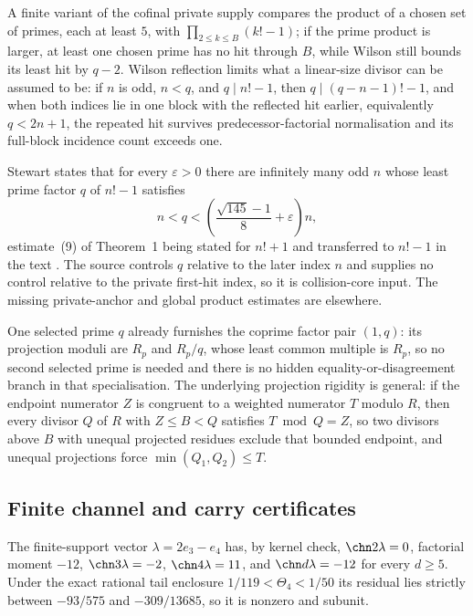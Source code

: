 A finite variant of the cofinal private supply compares the product of a
chosen set of primes, each at least $5$, with $\prod_{2\le k\le B}(k!-1)$; if
the prime product is larger, at least one chosen prime has no hit through
$B$, while Wilson still bounds its least hit by $q-2$.  Wilson reflection
limits what a linear-size divisor can be assumed to be: if $n$ is odd,
$n<q$, and $q\mid n!-1$, then $q\mid(q-n-1)!-1$, and when both indices lie in
one block with the reflected hit earlier, equivalently $q<2n+1$, the repeated
hit survives predecessor-factorial normalisation and its full-block incidence
count exceeds one.

Stewart states that for every $\varepsilon>0$ there are infinitely many odd
$n$ whose least prime factor $q$ of $n!-1$ satisfies
\[
 n<q<\left(\frac{\sqrt{145}-1}{8}+\varepsilon\right)n ,
\]
estimate~(9) of Theorem~1 being stated for $n!+1$ \cite[p.~463]{stewart2004}
and transferred to $n!-1$ in the text \cite[p.~464]{stewart2004}.  The source
controls $q$ relative to the later
index $n$ and supplies no control relative to the private first-hit index,
so it is collision-core input.  The missing private-anchor and global product
estimates are elsewhere.

One selected prime $q$ already furnishes the coprime factor pair $(1,q)$: its
projection moduli are $R_p$ and $R_p/q$, whose least common multiple is
$R_p$, so no second selected prime is needed and there is no hidden
equality-or-disagreement branch in that specialisation.  The underlying
projection rigidity is general: if the endpoint numerator $Z$ is congruent to
a weighted numerator $T$ modulo $R$, then every divisor $Q$ of $R$ with
$Z\le B<Q$ satisfies $T\bmod Q=Z$, so two divisors above $B$ with unequal
projected residues exclude that bounded endpoint, and unequal projections
force $\min(Q_1,Q_2)\le T$.

\subsection{Finite channel and carry certificates}\label{long68:sec:ext-certificates}

The finite-support vector $\lambda=2e_3-e_4$ has, by kernel check,
$\chn2\lambda=0$, factorial moment $-12$, $\chn3\lambda=-2$,
$\chn4\lambda=11$, and $\chn d\lambda=-12$ for every $d\ge5$.  Under the
exact rational tail enclosure $1/119<\Theta_4<1/50$ its residual lies
strictly between $-93/575$ and $-309/13685$, so it is nonzero and subunit.

